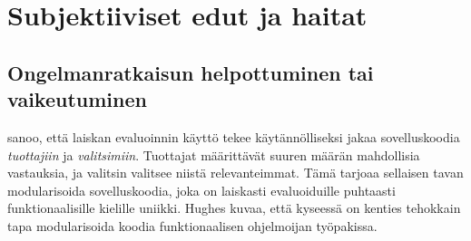

\section{Subjektiiviset edut ja haitat} \label{subjektiiviset-edut}

\subsection{Ongelmanratkaisun helpottuminen tai vaikeutuminen}
\citet{hughes1989functional} sanoo, että laiskan evaluoinnin käyttö tekee käytännölliseksi jakaa sovelluskoodia \textit{tuottajiin} ja \textit{valitsimiin}. Tuottajat määrittävät suuren määrän mahdollisia vastauksia, ja valitsin valitsee niistä relevanteimmat. Tämä tarjoaa sellaisen tavan modularisoida sovelluskoodia, joka on laiskasti evaluoiduille puhtaasti funktionaalisille kielille uniikki. Hughes kuvaa, että kyseessä on kenties tehokkain tapa modularisoida koodia funktionaalisen ohjelmoijan työpakissa.


